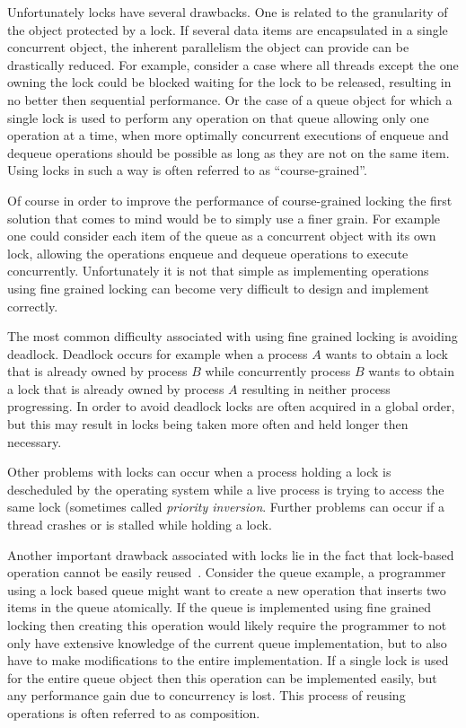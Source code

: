 Unfortunately locks have several drawbacks. One is related to the  granularity
of the object protected by a lock. If several data items 
are encapsulated  in a single  concurrent  object, the
inherent parallelism  the object can provide 
can be drastically reduced.
For example, consider a case where all threads except the one owning the lock could be blocked waiting
for the lock to be released, resulting in no better then sequential performance.
Or the case of a queue 
object for which a single lock is used to perform any operation on that queue
allowing only one operation at a time, when more optimally
concurrent executions of enqueue and dequeue operations 
should be possible as long as they are not on the same item.
Using locks in such a way is often referred to as ``course-grained''.


Of course in order to improve the performance of course-grained locking
the first solution that comes to mind would be to simply
use a finer grain.  For example one could consider
each item of the queue as  a concurrent object with its own lock,
allowing the  operations  enqueue  
and  dequeue  operations to execute concurrently.
Unfortunately it is not that simple as implementing operations using
fine grained locking can  become very   difficult  to  design and implement
correctly.

The most common difficulty associated with using fine grained locking
is avoiding deadlock.
Deadlock occurs for example when a process $A$ wants to obtain a lock that
is already owned by process $B$ while concurrently process $B$ wants
to obtain a lock that is already owned by process $A$ resulting
in neither process progressing.
In order to avoid deadlock locks are often acquired in a global order,
but this may result in locks being taken more often and held longer then necessary.

Other problems with locks can occur when a process holding a lock
is descheduled by the operating system while a live process is trying to
access the same lock (sometimes called \emph{priority inversion}.
Further problems can occur if a thread crashes or is stalled while
holding a lock.

Another important drawback associated with locks lie in the fact that 
lock-based operation cannot be easily reused~\cite{HMPH05,GG11}.
Consider the queue example, a programmer using a lock based queue
might want to create a new operation that inserts two items in the queue
atomically.
If the queue is implemented using fine grained locking then creating this operation
would likely require the programmer to not only have extensive knowledge of the current
queue implementation, but to also have to make modifications to the entire implementation.
If a single lock is used for the entire queue object then this operation can be implemented
easily, but any performance gain due to concurrency is lost.
This process of reusing operations is often referred to as composition.


